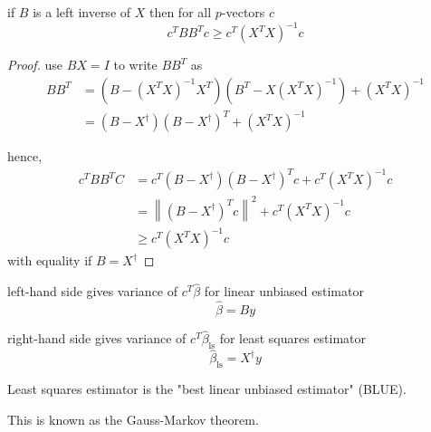 \begin{theorem}
    if $ B $ is a left inverse of $ X $ then for all $ p $-vectors $ c $
$$
c^{T} B B^{T} c \geq c^{T}\left(X^{T} X\right)^{-1} c
$$
\end{theorem}


\begin{proof}
    use $ B X=I $ to write $ B B^{T} $ as
$$
\begin{aligned}
B B^{T} &=\left(B-\left(X^{T} X\right)^{-1} X^{T}\right)\left(B^{T}-X\left(X^{T} X\right)^{-1}\right)+\left(X^{T} X\right)^{-1} \\
&=\left(B-X^{\dagger}\right)\left(B-X^{\dagger}\right)^{T}+\left(X^{T} X\right)^{-1}
\end{aligned}
$$

hence,
$$
\begin{aligned}
c^{T} B B^{T} C &=c^{T}\left(B-X^{\dagger}\right)\left(B-X^{\dagger}\right)^{T} c+c^{T}\left(X^{T} X\right)^{-1} c \\
&=\left\|\left(B-X^{\dagger}\right)^{T} c\right\|^{2}+c^{T}\left(X^{T} X\right)^{-1} c \\
& \geq c^{T}\left(X^{T} X\right)^{-1} c
\end{aligned}
$$
with equality if $ B=X^{\dagger} $
\end{proof}

\begin{corollary}
    left-hand side gives variance of $ c^{T} \hat{\beta} $ for linear unbiased estimator
$$
\hat{\beta}=B y
$$
\end{corollary}

\begin{corollary}
    right-hand side gives variance of $ c^{T} \hat{\beta}_{\mathrm{ls}} $ for least squares estimator
$$
\hat{\beta}_{\mathrm{ls}}=X^{\dagger} y
$$
\end{corollary}

\begin{theorem}
    Least squares estimator is the "best linear unbiased estimator" (BLUE).
\end{theorem}

This is known as the Gauss-Markov theorem.

